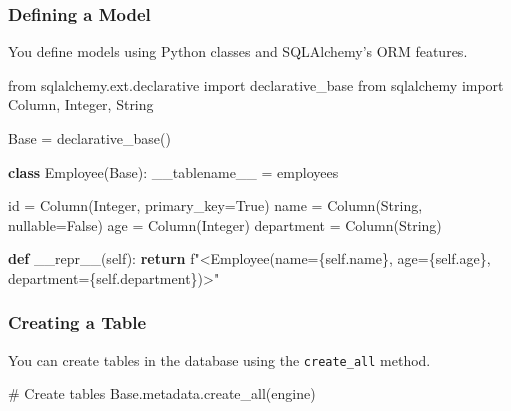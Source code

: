 \documentclass[
  letterpaper,
  DIV=11,
  numbers=noendperiod]{scrreprt}
\newenvironment{Shaded}{\begin{snugshade}}{\end{snugshade}}
\newcommand{\BuiltInTok}[1]{\textcolor[rgb]{0.00,0.23,0.31}{#1}}
\newcommand{\CommentTok}[1]{\textcolor[rgb]{0.37,0.37,0.37}{#1}}
\newcommand{\ControlFlowTok}[1]{\textcolor[rgb]{0.00,0.23,0.31}{\textbf{#1}}}
\newcommand{\FunctionTok}[1]{\textcolor[rgb]{0.28,0.35,0.67}{#1}}
\newcommand{\ImportTok}[1]{\textcolor[rgb]{0.00,0.46,0.62}{#1}}
\newcommand{\KeywordTok}[1]{\textcolor[rgb]{0.00,0.23,0.31}{\textbf{#1}}}
\newcommand{\NormalTok}[1]{\textcolor[rgb]{0.00,0.23,0.31}{#1}}
\newcommand{\OperatorTok}[1]{\textcolor[rgb]{0.37,0.37,0.37}{#1}}
\newcommand{\SpecialCharTok}[1]{\textcolor[rgb]{0.37,0.37,0.37}{#1}}
\newcommand{\SpecialStringTok}[1]{\textcolor[rgb]{0.13,0.47,0.30}{#1}}
\newcommand{\StringTok}[1]{\textcolor[rgb]{0.13,0.47,0.30}{#1}}
\newcommand{\VariableTok}[1]{\textcolor[rgb]{0.07,0.07,0.07}{#1}}
\begin{document}
\subsubsection{Defining a Model}\label{defining-a-model}

You define models using Python classes and SQLAlchemy's ORM features.

\begin{Shaded}
\begin{Highlighting}[]
\ImportTok{from}\NormalTok{ sqlalchemy.ext.declarative }\ImportTok{import}\NormalTok{ declarative\_base}
\ImportTok{from}\NormalTok{ sqlalchemy }\ImportTok{import}\NormalTok{ Column, Integer, String}

\NormalTok{Base }\OperatorTok{=}\NormalTok{ declarative\_base()}

\KeywordTok{class}\NormalTok{ Employee(Base):}
\NormalTok{    \_\_tablename\_\_ }\OperatorTok{=} \StringTok{\textquotesingle{}employees\textquotesingle{}}

    \BuiltInTok{id} \OperatorTok{=}\NormalTok{ Column(Integer, primary\_key}\OperatorTok{=}\VariableTok{True}\NormalTok{)}
\NormalTok{    name }\OperatorTok{=}\NormalTok{ Column(String, nullable}\OperatorTok{=}\VariableTok{False}\NormalTok{)}
\NormalTok{    age }\OperatorTok{=}\NormalTok{ Column(Integer)}
\NormalTok{    department }\OperatorTok{=}\NormalTok{ Column(String)}

    \KeywordTok{def} \FunctionTok{\_\_repr\_\_}\NormalTok{(}\VariableTok{self}\NormalTok{):}
        \ControlFlowTok{return} \SpecialStringTok{f"\textless{}Employee(name=}\SpecialCharTok{\{}\VariableTok{self}\SpecialCharTok{.}\NormalTok{name}\SpecialCharTok{\}}\SpecialStringTok{, age=}\SpecialCharTok{\{}\VariableTok{self}\SpecialCharTok{.}\NormalTok{age}\SpecialCharTok{\}}\SpecialStringTok{, department=}\SpecialCharTok{\{}\VariableTok{self}\SpecialCharTok{.}\NormalTok{department}\SpecialCharTok{\}}\SpecialStringTok{)\textgreater{}"}
\end{Highlighting}
\end{Shaded}

\subsubsection{Creating a Table}\label{creating-a-table-1}

You can create tables in the database using the \texttt{create\_all}
method.

\begin{Shaded}
\begin{Highlighting}[]
\CommentTok{\# Create tables}
\NormalTok{Base.metadata.create\_all(engine)}
\end{Highlighting}
\end{Shaded}
\end{document}
